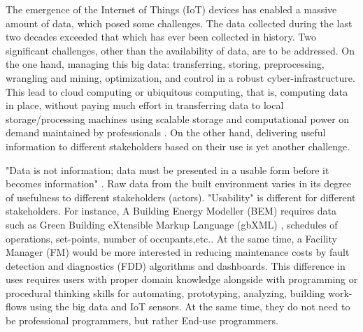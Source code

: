 \documentclass{scsSimAUDPaperFormat}
\begin{document}
The emergence of the Internet of Things (IoT) devices has enabled a massive amount of data, which posed some challenges. The data collected during the last two decades exceeded that which has ever been collected in history\cite{Ramaswamy2015InternetReview}. Two significant challenges, other than the availability of data, are to be addressed. On the one hand, managing this big data: transferring, storing, preprocessing, wrangling and mining, optimization, and control in a robust cyber-infrastructure. This lead to cloud computing or ubiquitous computing, that is, computing data in place, without paying much effort in transferring data to local storage/processing machines using scalable storage and computational power on demand maintained by professionals \cite{MellTheTechnology,Bhardwaj2010CLOUDIAAS,Dillon2010CloudChallenges}. On the other hand, delivering useful information to different stakeholders based on their use is yet another challenge.

"Data is not information; data must be presented in a usable form before it becomes information" \cite[p.134]{Reen1996UsabilityFramework}. Raw data from the built environment varies in its degree of usefulness to different stakeholders (actors). "Usability" is different for different stakeholders. For instance, A Building Energy Modeller (BEM) requires data such as Green Building eXtensible Markup Language (gbXML) \cite{GbXMLSchema}, schedules of operations, set-points, number of occupants,etc.. At the same time, a Facility Manager (FM) would be more interested in reducing maintenance costs by fault detection and diagnostics (FDD)\cite{Zibion2018DevelopmentInformation} algorithms and dashboards. This difference in uses requires users with proper domain knowledge alongside with programming or procedural thinking skills for automating, prototyping, analyzing, building work-flows using the big data and IoT sensors. At the same time, they do not need to be professional programmers, but rather End-use programmers.
\end{document}
